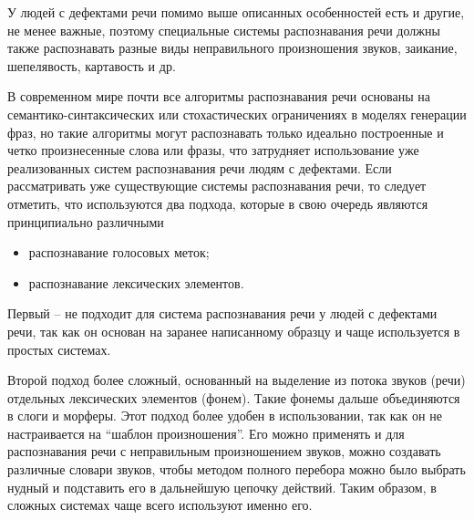 У людей с дефектами речи помимо выше описанных особенностей есть и другие, не менее важные, поэтому специальные системы распознавания речи должны также распознавать разные виды неправильного произношения звуков, заикание, шепелявость, картавость и др.

В современном мире почти все алгоритмы распознавания речи основаны на семантико-синтаксических или стохастических ограничениях в моделях генерации фраз, но такие алгоритмы могут распознавать только идеально построенные и четко произнесенные слова или фразы, что затрудняет использование уже реализованных систем распознавания речи людям с дефектами.
Если рассматривать уже существующие системы распознавания речи, то следует отметить, что используются два подхода, которые в свою очередь являются принципиально различными
\begin{itemize}
	\item распознавание голосовых меток;
	\item распознавание лексических элементов.
\end{itemize}

Первый -- не подходит для система распознавания речи у людей с дефектами речи, так как он основан на заранее написанному образцу и чаще используется в простых системах.

Второй подход более сложный, основанный на выделение из потока звуков (речи) отдельных лексических элементов (фонем). Такие фонемы дальше объединяются в слоги и морферы. Этот подход более удобен в использовании, так как он не настраивается на “шаблон произношения”. Его можно применять и для распознавания речи с неправильным произношением звуков, можно создавать различные словари звуков, чтобы методом полного перебора можно было выбрать нудный и подставить его в дальнейшую цепочку действий. Таким образом, в сложных системах чаще всего используют именно его.